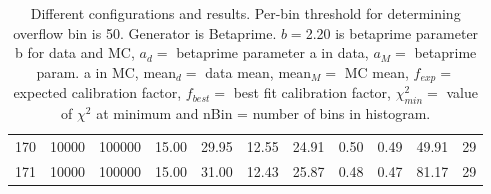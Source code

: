 \begin{table}[htp]
\begin{center}
\begin{tabular}{|r|rr| rr| rr| rr| rr|}
   170& 10000&100000& 15.00& 29.95& 12.55& 24.91&  0.50&  0.49& 49.91&    29 \\ 
   171& 10000&100000& 15.00& 31.00& 12.43& 25.87&  0.48&  0.47& 81.17&    29 \\ 
\hline 
\end{tabular} 
\label{tab:betaprime_results_thres50} 
\caption{Different configurations and results. Per-bin threshold for determining overflow bin is 50. Generator is Betaprime. $b = $2.20 is betaprime parameter b for data and MC, $a_d = $ betaprime parameter a in data, $a_M =$ betaprime param. a in MC, mean$_d = $ data mean, mean$_M = $ MC mean,  $f_{exp}=$ expected calibration factor, $f_{best} =$ best fit calibration factor, $\chi^2_{min} = $ value of $\chi^2$ at minimum and nBin = number of bins in histogram.} 
\end{center} 
\end{table} 

